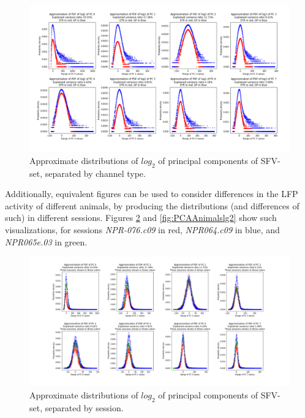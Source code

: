 \documentclass{article}
\begin{document}
\begin{figure}[H]
    \centering
    \centerline{\includegraphics[width=1\textwidth]{images/PCA/PCABOTHLG2.png}}
    \caption{Approximate distributions of \begin{math}log_2\end{math} of principal components of SFV-set, separated by channel type.}
    \label{fig:PCAPDFBOTHLG2}
\end{figure}

Additionally, equivalent figures can be used to consider differences in the LFP activity of different animals, by producing the distributions (and differences of such) in different sessions.
Figures \ref{fig:PCAAnimals} and \ref{fig:PCAAnimalslg2} show such visualizations, for sessions \textit{NPR-076.c09} in red, \textit{NPR064.c09} in blue, and \textit{NPR065e.03} in green.

\begin{figure}[H]
    \centering
    \centerline{\includegraphics[width=1\textwidth]{images/PCA/PCAAnimalsnormal.png}}
    \caption{Approximate distributions of \begin{math}log_2\end{math} of principal components of SFV-set, separated by session.}
    \label{fig:PCAAnimals}
\end{figure}
\end{document}
